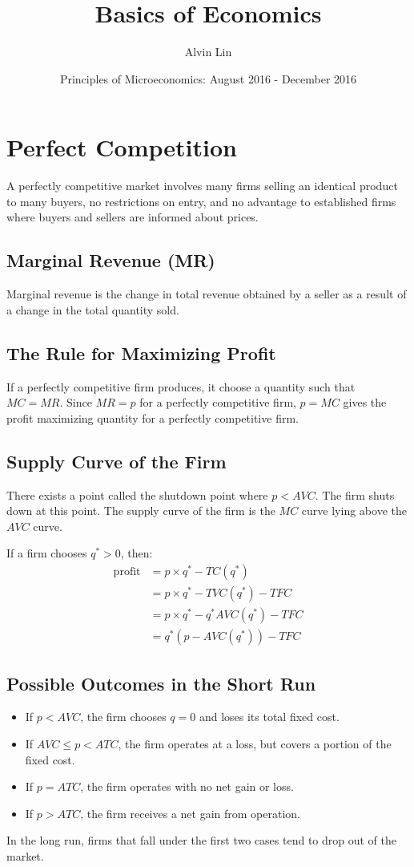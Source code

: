 \documentclass{article}
\title{Basics of Economics}
\author{Alvin Lin}
\date{Principles of Microeconomics: August 2016 - December 2016}
\begin{document}
\maketitle

\section{Perfect Competition}
A perfectly competitive market involves many firms selling an identical product
to many buyers, no restrictions on entry, and no advantage to established firms
where buyers and sellers are informed about prices.

\subsection{Marginal Revenue (MR)}
Marginal revenue is the change in total revenue obtained by a seller as a
result of a change in the total quantity sold.

\subsection{The Rule for Maximizing Profit}
If a perfectly competitive firm produces, it choose a quantity such that
\( MC = MR \). Since \( MR = p \) for a perfectly competitive firm,
\( p = MC \) gives the profit maximizing quantity for a perfectly competitive
firm.

\subsection{Supply Curve of the Firm}
There exists a point called the shutdown point where \( p < AVC \). The firm
shuts down at this point. The supply curve of the firm is the \( MC \) curve
lying above the \( AVC \) curve. \par
If a firm chooses \( q^{*} > 0 \), then:
\begin{align*}
  \mathrm{profit} &= p \times q^{*}-TC(q^{*}) \\
  &= p \times q^{*}-TVC(q^{*})-TFC \\
  &= p \times q^{*}-q^{*}AVC(q^{*})-TFC \\
  &= q^{*}(p-AVC(q^{*}))-TFC
\end{align*}

\subsection{Possible Outcomes in the Short Run}
\begin{itemize}
  \item If \( p < AVC \), the firm chooses \( q = 0 \) and loses its total
    fixed cost.
  \item If \( AVC \leq p < ATC \), the firm operates at a loss, but covers a
    portion of the fixed cost.
  \item If \( p = ATC \), the firm operates with no net gain or loss.
  \item If \( p > ATC \), the firm receives a net gain from operation.
\end{itemize}
In the long run, firms that fall under the first two cases tend to drop out of
the market.
\end{document}
